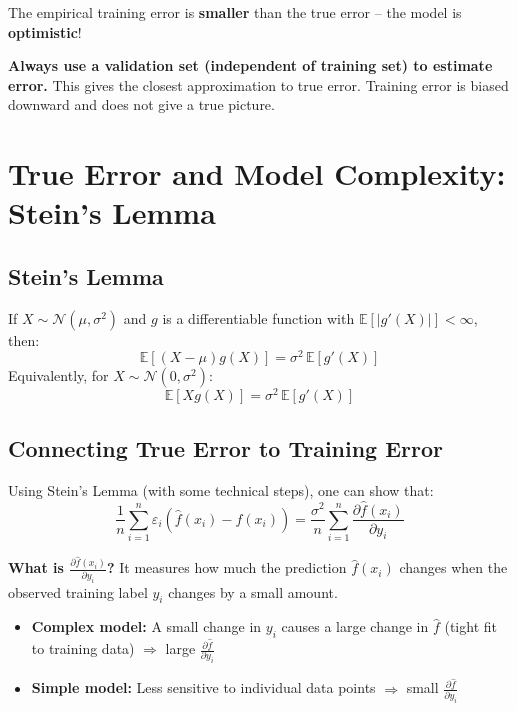 \documentclass[12pt,a4paper]{article}
\newcommand{\E}{\mathbb{E}}
\begin{document}
The empirical training error is \textbf{smaller} than the true error -- the model is \textbf{optimistic}!

\begin{alertbox}
\textbf{Always use a validation set (independent of training set) to estimate error.} This gives the closest approximation to true error. Training error is biased downward and does not give a true picture.
\end{alertbox}

\section{True Error and Model Complexity: Stein's Lemma}

\subsection{Stein's Lemma}

\begin{thmbox}[title={Stein's Lemma}]
If $X \sim \mathcal{N}(\mu, \sigma^2)$ and $g$ is a differentiable function with $\E[|g'(X)|] < \infty$, then:
\[
\E[(X-\mu)g(X)] = \sigma^2\,\E[g'(X)]
\]
Equivalently, for $X \sim \mathcal{N}(0, \sigma^2)$:
\[
\E[Xg(X)] = \sigma^2\,\E[g'(X)]
\]
\end{thmbox}

\subsection{Connecting True Error to Training Error}

Using Stein's Lemma (with some technical steps), one can show that:
\[
\frac{1}{n}\sum_{i=1}^{n}\varepsilon_i(\hat{f}(x_i) - f(x_i))
= \frac{\sigma^2}{n}\sum_{i=1}^{n}\frac{\partial\hat{f}(x_i)}{\partial y_i}
\]

\textbf{What is $\frac{\partial\hat{f}(x_i)}{\partial y_i}$?} It measures how much the prediction $\hat{f}(x_i)$ changes when the observed training label $y_i$ changes by a small amount.

\begin{itemize}
  \item \textbf{Complex model:} A small change in $y_i$ causes a large change in $\hat{f}$ (tight fit to training data) $\Rightarrow$ large $\frac{\partial\hat{f}}{\partial y_i}$
  \item \textbf{Simple model:} Less sensitive to individual data points $\Rightarrow$ small $\frac{\partial\hat{f}}{\partial y_i}$
\end{itemize}
\end{document}
